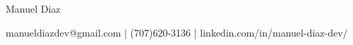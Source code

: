 \documentclass[a4,10pt]{article}
\newcommand{\subtext}[1]{
#1\par\vspace{-0.2cm}}
\begin{document}
\begin{center}

    \begin{minipage}[b]{1.0\textwidth}
            \centering
            {\HUGE Manuel Diaz} \\ %
            \vspace{0.1cm}
            
            {\Large{manueldiazdev@gmail.com | (707)620-3136 | linkedin.com/in/manuel-diaz-dev/}} \\
    \end{minipage}%
    
\vspace{-0.15cm} 
\end{center}



\vspace{-0.15cm}
\end{document}
